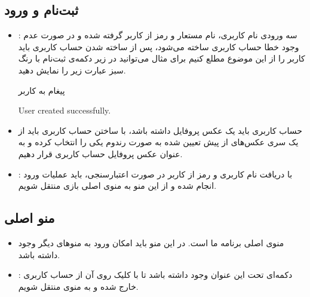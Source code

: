 \documentclass[]{article}
\begin{document}
\subsection*{{\titr ثبت‌نام و ورود}}
\begin{itemize}
	\item {}:
	سه ورودی نام کاربری، نام مستعار و رمز از کاربر گرفته شده و در صورت عدم وجود خطا حساب کاربری ساخته می‌شود، پس از ساخته شدن حساب کاربری باید کاربر را از این موضوع مطلع کنیم برای مثال می‌توانید در زیر دکمه‌ی ثبت‌نام با رنگ سبز عبارت زیر را نمایش دهید.
	
	
	\begin{mybox}[colback=yellow]{پیغام به کاربر}
		\begin{latin}	
			User created successfully.
		\end{latin}
	\end{mybox}
	
	\item
	حساب کاربری باید یک عکس پروفایل داشته باشد، با ساختن حساب کاربری باید از یک سری عکس‌های از پیش تعیین شده به صورت رندوم یکی را انتخاب کرده و به عنوان عکس پروفایل حساب کاربری قرار دهیم.
	\item {}:
	با دریافت نام کاربری و رمز از کاربر در صورت اعتبارسنجی، باید عملیات ورود انجام شده و از این منو به منوی اصلی بازی منتقل شویم.
\end{itemize}


\subsection*{{\titr منو اصلی}}

\begin{itemize}
    \item
     منوی اصلی برنامه ما است. در این منو باید امکان ورود به منو‌های دیگر وجود داشته باشد.
    \item
     : دکمه‌ای تحت این عنوان وجود داشته باشد تا با کلیک روی آن از حساب کاربری خارج شده و به منوی  منتقل شویم.
\end{itemize}
\end{document}
